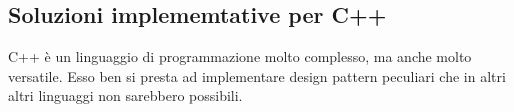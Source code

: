 \subsection{Soluzioni implememtative per C++}
C++ è un linguaggio di programmazione molto complesso, ma anche molto versatile. Esso ben si presta 
ad implementare design pattern peculiari che in altri altri linguaggi non sarebbero possibili.




